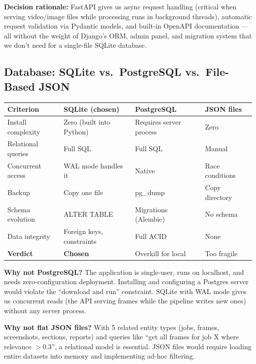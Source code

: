 \documentclass[12pt, a4paper]{article}
\begin{document}
\textbf{Decision rationale:} FastAPI gives us async request handling (critical when serving video/image files while processing runs in background threads), automatic request validation via Pydantic models, and built-in OpenAPI documentation --- all without the weight of Django's ORM, admin panel, and migration system that we don't need for a single-file SQLite database.

\subsection{Database: SQLite vs.\ PostgreSQL vs.\ File-Based JSON}

\begin{longtable}{@{} p{3cm} p{3.5cm} p{3.5cm} p{3.5cm} @{}}
    \toprule
    \textbf{Criterion} & \textbf{SQLite (chosen)} & \textbf{PostgreSQL} & \textbf{JSON files} \\
    \midrule
    Install complexity & Zero (built into Python) & Requires server process & Zero \\
    Relational queries & Full SQL & Full SQL & Manual \\
    Concurrent access & WAL mode handles it & Native & Race conditions \\
    Backup & Copy one file & pg\_dump & Copy directory \\
    Schema evolution & ALTER TABLE & Migrations (Alembic) & No schema \\
    Data integrity & Foreign keys, constraints & Full ACID & None \\
    \midrule
    \textbf{Verdict} & \textcolor{acceptgreen}{\textbf{Chosen}} & Overkill for local & Too fragile \\
    \bottomrule
\end{longtable}

\textbf{Why not PostgreSQL?} The application is single-user, runs on localhost, and needs zero-configuration deployment. Installing and configuring a Postgres server would violate the ``download and run'' constraint. SQLite with WAL mode gives us concurrent reads (the API serving frames while the pipeline writes new ones) without any server process.

\textbf{Why not flat JSON files?} With 5 related entity types (jobs, frames, screenshots, sections, reports) and queries like ``get all frames for job X where relevance $> 0.3$'', a relational model is essential. JSON files would require loading entire datasets into memory and implementing ad-hoc filtering.
\end{document}
